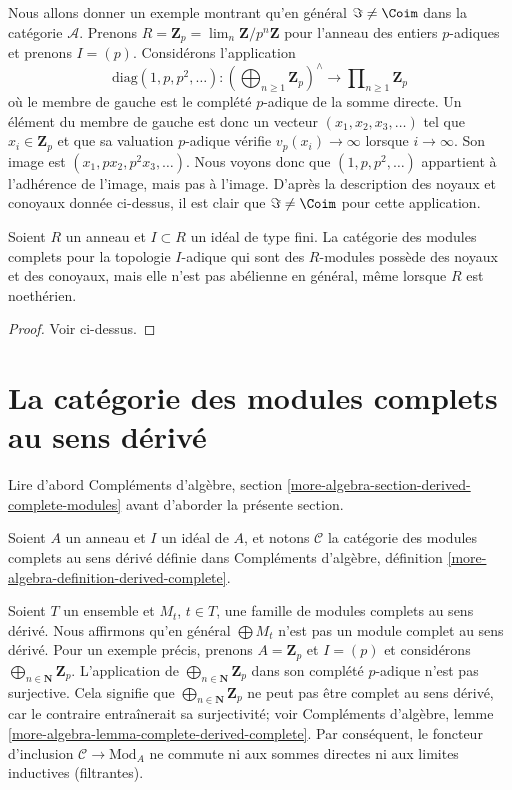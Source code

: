 \noindent
Nous allons donner un exemple montrant qu'en général $\Im \not = \Coim$ dans la
catégorie $\mathcal{A}$. Prenons
$R = \mathbf{Z}_p = \lim_n \mathbf{Z}/p^n\mathbf{Z}$
pour l'anneau des entiers $p$-adiques et prenons $I = (p)$.
Considérons l'application
$$
\text{diag}(1, p, p^2, \ldots) :
\left(\bigoplus\nolimits_{n \geq 1} \mathbf{Z}_p\right)^\wedge
\longrightarrow
\prod\nolimits_{n \geq 1} \mathbf{Z}_p
$$
où le membre de gauche est le complété $p$-adique de la somme directe.
Un élément du membre de gauche est donc un vecteur $(x_1, x_2, x_3, \ldots)$
tel que $x_i \in \mathbf{Z}_p$ et que sa valuation $p$-adique vérifie $v_p(x_i) \to \infty$ lorsque
$i \to \infty$. Son image est $(x_1, px_2, p^2x_3, \ldots)$. Nous voyons donc
que $(1, p, p^2, \ldots)$ appartient à l'adhérence de l'image, mais pas à
l'image. D'après la description des noyaux et conoyaux donnée ci-dessus, il est
clair que $\Im \not = \Coim$ pour cette application.

\begin{lemma}
\label{lemma-complete-modules-not-abelian}
Soient $R$ un anneau et $I \subset R$ un idéal de type fini.
La catégorie des modules complets pour la topologie $I$-adique qui sont des $R$-modules possède des noyaux et des
conoyaux, mais elle n'est pas abélienne en général, même lorsque $R$ est noethérien.
\end{lemma}

\begin{proof}
Voir ci-dessus.
\end{proof}





\section{La catégorie des modules complets au sens dérivé}
\label{section-derived-complete-modules}

\noindent
Lire d'abord Compléments d'algèbre, section
\ref{more-algebra-section-derived-complete-modules}
avant d'aborder la présente section.

\medskip\noindent
Soient $A$ un anneau et $I$ un idéal de $A$, et notons $\mathcal{C}$
la catégorie des modules complets au sens dérivé définie dans
Compléments d'algèbre, définition \ref{more-algebra-definition-derived-complete}.

\medskip\noindent
Soient $T$ un ensemble et $M_t$, $t \in T$, une famille de modules complets
au sens dérivé. Nous affirmons qu'en général $\bigoplus M_t$ n'est pas un module complet
au sens dérivé. Pour un exemple précis, prenons $A = \mathbf{Z}_p$ et $I = (p)$ et
considérons $\bigoplus_{n \in \mathbf{N}} \mathbf{Z}_p$. L'application de
$\bigoplus_{n \in \mathbf{N}} \mathbf{Z}_p$ dans son complété $p$-adique
n'est pas surjective. Cela signifie que $\bigoplus_{n \in \mathbf{N}} \mathbf{Z}_p$
ne peut pas être complet au sens dérivé, car le contraire entraînerait sa surjectivité; voir
Compléments d'algèbre, lemme \ref{more-algebra-lemma-complete-derived-complete}.
Par conséquent, le foncteur d'inclusion $\mathcal{C} \to \text{Mod}_A$ ne commute
ni aux sommes directes ni aux limites inductives (filtrantes).

